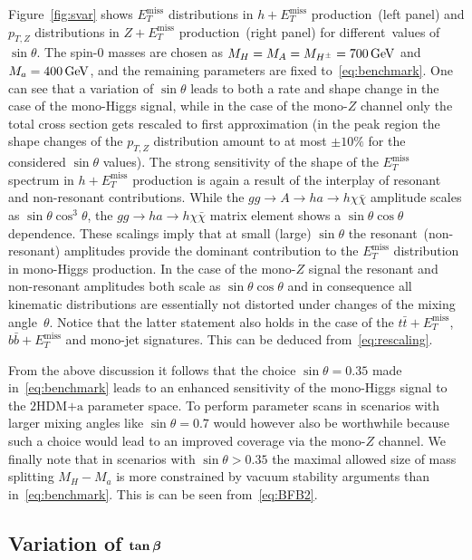 \documentclass[a4paper, 11pt,notoc]{article}
\newcommand{\MET}{\ensuremath{E_T^\mathrm{miss}}\xspace}
\newcommand{\mA}{\ensuremath{M_{A}}\xspace}
\newcommand{\ma}{\ensuremath{M_{a}}\xspace}
\newcommand{\mH}{\ensuremath{M_{H}}\xspace}
\newcommand{\mHc}{\ensuremath{M_{H^{\pm}}}\xspace}
\newcommand{\hdma}{\ensuremath{\textrm{2HDM+a}}\xspace}
\def\bm#1{\mbox{\boldmath$#1$\unboldmath}}
\begin{document}
Figure~\ref{fig:svar} shows $\MET$ distributions in $h + \MET$ production~(left panel) and $p_{T,Z}$ distributions in $Z+\MET$ production~(right panel) for different~values of $\sin \theta$. The spin-0 masses are chosen as $\mH = \mA = \mHc = 700 \, {\rm GeV}$ and $\ma = 400 \, {\rm GeV}$, and the remaining parameters are fixed to~\eqref{eq:benchmark}.  {\color{red} One can see that a variation of $\sin \theta$ leads to both a rate and shape change in the case of the mono-Higgs signal, while in the case of the mono-$Z$ channel only the total cross section gets rescaled to first approximation (in the peak region the shape changes of the $p_{T,Z}$ distribution amount to at most $\pm 10\%$ for the considered $\sin \theta$ values).} {\color{blue} The strong sensitivity of the shape of the $\MET$ spectrum in $h + \MET$ production is again a result of the interplay of resonant and non-resonant contributions.} While the $gg \to A \to h a \to h \chi \bar \chi$  amplitude scales as $\sin \theta \cos^3 \theta$, the $gg \to h a  \to h \chi \bar \chi$ matrix element shows a $\sin \theta \cos \theta$ dependence. These scalings imply that at small (large) $\sin \theta$ the resonant~(non-resonant) amplitudes provide the dominant contribution to the $\MET$ distribution in mono-Higgs production. {\color{magenta} In the case of the mono-$Z$ signal the resonant and non-resonant amplitudes both scale as $\sin \theta \cos \theta$ and in consequence  all kinematic distributions are essentially not distorted  under changes of the mixing angle~$\theta$.} Notice that the latter statement also holds in the case of the $t \bar t +\MET$, $b \bar b + \MET$ and mono-jet signatures.  This can be deduced from~\eqref{eq:rescaling}. 

From the above discussion it follows that the choice $\sin \theta = 0.35$ made in~\eqref{eq:benchmark} leads to an enhanced sensitivity of the mono-Higgs signal to the \hdma parameter space. To perform parameter scans in scenarios with larger mixing angles like $\sin \theta = 0.7$ would however also be worthwhile because such a choice would lead to an improved coverage via the mono-$Z$ channel. We finally note that in scenarios with $\sin \theta >0.35$ the maximal allowed size of mass splitting $M_H - M_a$ is more constrained by vacuum stability arguments than in~\eqref{eq:benchmark}. This is can be seen from~\eqref{eq:BFB2}. 

\subsection*{Variation of $\bm{\tan \beta}$}
\end{document}
